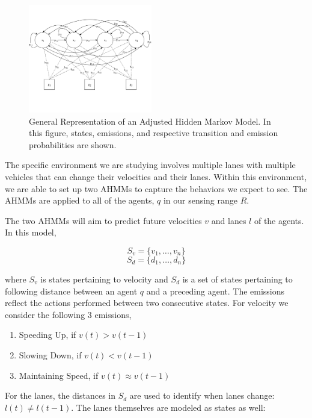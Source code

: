 \documentclass[letterpaper, 10 pt, conference]{ieeeconf}  %
\newcommand\NB[1]{$\spadesuit$\footnote{NB: #1}}
\begin{document}
\begin{figure}[ht!]
    \includegraphics[width=0.48\textwidth]{ahmm.png}
    \caption{General Representation of an Adjusted Hidden Markov Model. In this figure, states, emissions, and respective transition and emission probabilities are shown.}
    \label{fig:hmm}
\end{figure}

The specific environment we are studying involves multiple lanes with multiple vehicles that can change their velocities and their lanes. Within this environment, we are able to set up two AHMMs to capture the behaviors we expect to see. The AHMMs are applied to all of the agents, $q$ in our sensing range $R$.

The two AHMMs will aim to predict future velocities $v$ and lanes $l$ of the agents. In this model,

\begin{equation}
    S_v = \{v_1,\ldots, v_n\}
\end{equation}
\begin{equation}
    S_d = \{d_1,\ldots,d_n\}
\end{equation}

    where $S_v$ is states pertaining to velocity and $S_d$ is a set of states pertaining to following distance between an agent $q$ and a preceding agent. The emissions reflect the actions performed between two consecutive states. For velocity we consider the following 3 emissions,

\begin{enumerate}
    \item Speeding Up, if $v(t) > v(t-1)$
    \item Slowing Down, if $v(t) < v(t-1)$
    \item Maintaining Speed, if $v(t) \approx v(t-1)$
\end{enumerate}

For the lanes,  the distances in $S_d$ are used to identify when lanes change: $l(t) \neq l(t-1)$. The lanes themselves are modeled as states as well:
\end{document}

